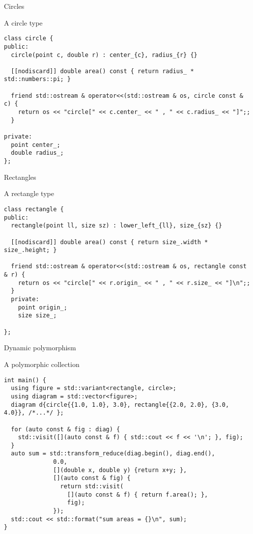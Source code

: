 \begin{frame}[t,fragile]{Circles}
\begin{block}{A circle type}
\begin{lstlisting}
class circle {
public:
  circle(point c, double r) : center_{c}, radius_{r} {}

  [[nodiscard]] double area() const { return radius_ * std::numbers::pi; }

  friend std::ostream & operator<<(std::ostream & os, circle const & c) {
    return os << "circle[" << c.center_ << " , " << c.radius_ << "]";;
  }

private:
  point center_;
  double radius_;
};
\end{lstlisting}
\end{block}
\end{frame}

\begin{frame}[t,fragile]{Rectangles}
\begin{block}{A rectangle type}
\begin{lstlisting}
class rectangle {
public:
  rectangle(point ll, size sz) : lower_left_{ll}, size_{sz} {}

  [[nodiscard]] double area() const { return size_.width * size_.height; }

  friend std::ostream & operator<<(std::ostream & os, rectangle const & r) {
    return os << "circle[" << r.origin_ << " , " << r.size_ << "]\n";;
  }
  private:
    point origin_;
    size size_;

};
\end{lstlisting}
\end{block}
\end{frame}

\begin{frame}[t,fragile]{Dynamic polymorphism}
\begin{block}{A polymorphic collection}
\begin{lstlisting}[basicstyle=\tiny]
int main() {
  using figure = std::variant<rectangle, circle>;
  using diagram = std::vector<figure>;
  diagram d{circle{{1.0, 1.0}, 3.0}, rectangle{{2.0, 2.0}, {3.0, 4.0}}, /*...*/ };

  for (auto const & fig : diag) {
    std::visit([](auto const & f) { std::cout << f << '\n'; }, fig);
  }
  auto sum = std::transform_reduce(diag.begin(), diag.end(), 
              0.0,
              [](double x, double y) {return x+y; },
              [](auto const & fig) {
                return std::visit(
                  [](auto const & f) { return f.area(); }, 
                  fig);
              });
  std::cout << std::format("sum areas = {}\n", sum);
}
\end{lstlisting}
\end{block}
\end{frame}



